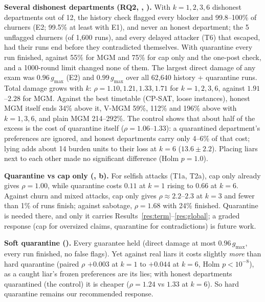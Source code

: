 \documentclass{article}
\theoremstyle{definition}
\newcommand{\1}{\mathbf{1}}
\newcommand{\gmax}{g_{\max}}
\begin{document}
\textbf{Several dishonest departments (RQ2, , ).} With $k=1,2,3,6$ dishonest departments out of 12, the history check flagged every blocker and 99.8--100\% of churners (E2; 99.5\% at least with E1), and never an honest department; the 5 unflagged churners (of 1{,}600 runs), and every delayed attacker (T6) that escaped, had their runs end before they contradicted themselves. With quarantine every run finished, against 55\% for MGM and 75\% for cap only and the one-post check, and a 1000-round limit changed none of them. The largest direct damage of any exam was $0.96\,\gmax$ (E2) and $0.99\,\gmax$ over all 62{,}640 history + quarantine runs. Total damage grows with $k$: $\rho=1.10, 1.21, 1.33, 1.71$ for $k=1,2,3,6$, against $1.91$--$2.28$ for MGM. Against the best timetable (CP-SAT, loose instances), honest MGM itself ends 34\% above it, V-MGM 59\%, 112\% and 196\% above with $k=1,3,6$, and plain MGM 214--292\%. The control shows that about half of the excess is the cost of quarantine itself ($\rho=1.06$--$1.33$): a quarantined department's preferences are ignored, and honest departments carry only 4--6\% of that cost; lying adds about 14 burden units to their loss at $k=6$ ($13.6\pm2.2$). Placing liars next to each other made no significant difference (Holm $p=1.0$).



\textbf{Quarantine vs cap only (, b).} For selfish attacks (T1a, T2a), cap only already gives $\rho=1.00$, while quarantine costs $0.11$ at $k=1$ rising to $0.66$ at $k=6$. Against churn and mixed attacks, cap only gives $\rho\approx2.2$--$2.3$ at $k=3$ and fewer than 1\% of runs finish; against sabotage, $\rho=1.68$ with 24\% finished. Quarantine is needed there, and only it carries Results~\ref{res:term}--\ref{res:global}; a graded response (cap for oversized claims, quarantine for contradictions) is future work.

\textbf{Soft quarantine ().} Every guarantee held (direct damage at most $0.96\,\gmax$, every run finished, no false flags). Yet against real liars it costs slightly \emph{more} than hard quarantine (paired $\rho$ $+0.003$ at $k=1$ to $+0.044$ at $k=6$, Holm $p<10^{-8}$), as a caught liar's frozen preferences are its lies; with honest departments quarantined (the control) it is cheaper ($\rho=1.24$ vs $1.33$ at $k=6$). So hard quarantine remains our recommended response.
\end{document}
